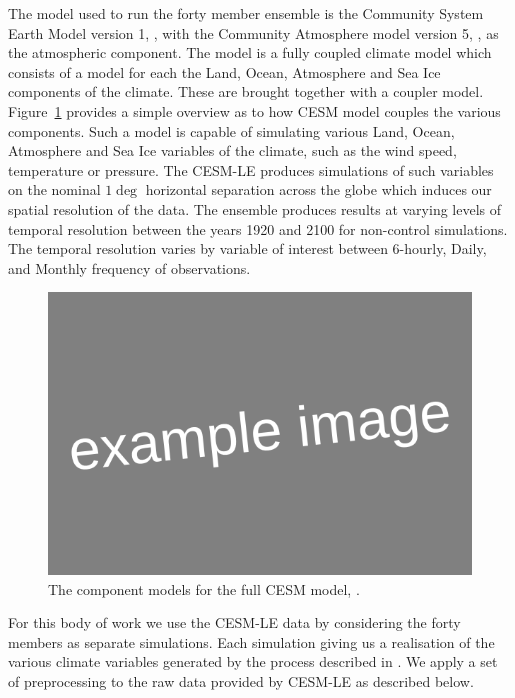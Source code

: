  The model used to run the forty member ensemble is the Community System Earth Model version 1, \citep{hurrell_community_2013}, with the Community Atmosphere model version 5, \citep{hurrell_community_2013}, as the atmospheric component.
 The model is a fully coupled climate model which consists of a model for each the Land, Ocean, Atmosphere and Sea Ice components of the climate.
 These are brought together with a coupler model.
 Figure~\ref{fig:cesm} provides a simple overview as to how CESM model couples the various components.
 Such a model is capable of simulating various Land, Ocean, Atmosphere and Sea Ice variables of the climate, such as the wind speed, temperature or pressure.
 The CESM-LE produces simulations of such variables on the nominal $1\deg$ horizontal separation across the globe which induces our spatial resolution of the data.
 The ensemble produces results at varying levels of temporal resolution between the years 1920 and 2100 for non-control simulations.
 The temporal resolution varies by variable of interest between 6-hourly, Daily, and Monthly frequency of observations.
 
 \begin{figure}[htbp!] 
 	\centering    
 	\includegraphics[width=1.0\textwidth]{Example_image}
 	\caption[CESM component models]{The component models for the full CESM model, \citep{kay_community_2015}.}
 	\label{fig:cesm}
 \end{figure}

 
 For this body of work we use the CESM-LE data by considering the forty members as separate simulations.
 Each simulation giving us a realisation of the various climate variables generated by the process described in \citep{kay_community_2015}.
 We apply a set of preprocessing to the raw data provided by CESM-LE as described below. 
 
